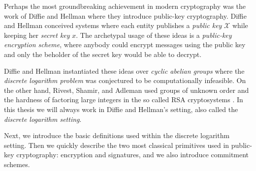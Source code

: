 Perhaps the most groundbreaking achievement in modern cryptography was the work of Diffie and Hellman \cite{DifHel76} where they introduce public-key cryptography. Diffie and Hellman conceived systems where each entity publishes a \emph{public key} $\mathcal{X}$ while keeping her \emph{secret key} $x$. The archetypal usage of these ideas is a \emph{public-key encryption scheme}, where anybody could encrypt messages using the public key and only the beholder of the secret key would be able to decrypt.

Diffie and Hellman instantiated these ideas over \emph{cyclic abelian groups} where the \emph{discrete logarithm problem} was conjectured to be computationally infeasible. On the other hand, Rivest, Shamir, and Adleman used groups of unknown order and the hardness of factoring large integers in the so called RSA cryptosystems \cite{RivShaAdl78}.
In this thesis we will always work in Diffie and Hellman's setting, also called the \emph{discrete logarithm setting}.

Next, we introduce the basic definitions used within the discrete logarithm setting. Then we quickly describe the two most classical primitives used in public-key cryptography: encryption and signatures, and we also introduce commitment schemes.

